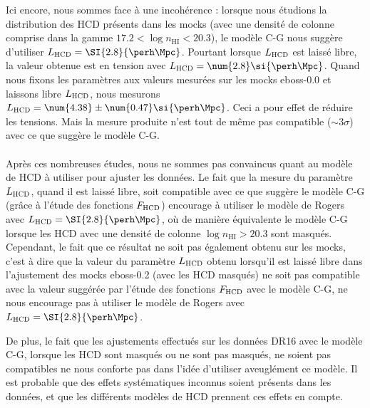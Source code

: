 Ici encore, nous sommes face à une incohérence : lorsque nous étudions la distribution des HCD présents dans les mocks (avec une densité de colonne comprise dans la gamme $\num{17.2} < \log n_{\mathrm{HI}} < \num{20.3}$), le modèle C-G nous suggère d'utiliser $L_{\textsc{HCD}} = \SI{2.8}{\perh\Mpc}$. Pourtant lorsque $L_{\textsc{HCD}}$ est laissé libre, la valeur obtenue est en tension avec $L_{\textsc{HCD}} = \num{2.8} \si{\perh\Mpc}$.
Quand nous fixons les paramètres \lya{} aux valeurs mesurées sur les mocks eboss-0.0 et laissons libre $L_{\textsc{HCD}}$, nous mesurons $L_{\textsc{HCD}} = \num{4.38} \pm \num{0.47} \si{\perh\Mpc}$. Ceci a pour effet de réduire les tensions. Mais la mesure produite n'est tout de même pas compatible ($\sim 3 \sigma$) avec ce que suggère le modèle C-G.


\paragraph{}
Après ces nombreuses études, nous ne sommes pas convaincus quant au modèle de HCD à utiliser pour ajuster les données.
Le fait que la mesure du paramètre $L_{\textsc{HCD}}$, quand il est laissé libre, soit compatible avec ce que suggère le modèle C-G (grâce à l'étude des fonctions $F_{\textsc{HCD}}$) encourage à utiliser le modèle de Rogers avec $L_{\textsc{HCD}} = \SI{2.8}{\perh\Mpc}$, où de manière équivalente le modèle C-G lorsque les HCD avec une densité de colonne $\log n_{\mathrm{HI}} > \num{20.3}$ sont masqués.
Cependant, le fait que ce résultat ne soit pas également obtenu sur les mocks, c'est à dire que la valeur du paramètre $L_{\textsc{HCD}}$ obtenu lorsqu'il est laissé libre dans l'ajustement des mocks eboss-0.2 (avec les HCD masqués) ne soit pas compatible avec la valeur suggérée par l'étude des fonctions $F_{\textsc{HCD}}$ avec le modèle C-G, ne nous encourage pas à utiliser le modèle de Rogers avec $L_{\textsc{HCD}} = \SI{2.8}{\perh\Mpc}$.

De plus, le fait que les ajustements effectués sur les données DR16 avec le modèle C-G, lorsque les HCD sont masqués ou ne sont pas masqués, ne soient pas compatibles ne nous conforte pas dans l'idée d'utiliser aveuglément ce modèle.
Il est probable que des effets systématiques inconnus soient présents dans les données, et que les différents modèles de HCD prennent ces effets en compte.

